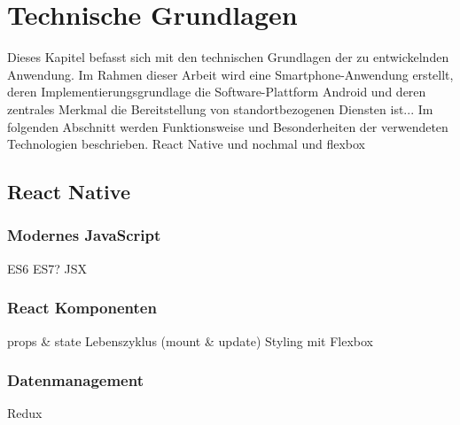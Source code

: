 \chapter{\label{chap:grundlagen}Technische Grundlagen}
Dieses Kapitel befasst sich mit den technischen Grundlagen der zu entwickelnden Anwendung. Im Rahmen dieser Arbeit wird eine \gls{Smartphone}-Anwendung erstellt, deren Implementierungsgrundlage die Software-Plattform Android und deren zentrales Merkmal die Bereitstellung von standortbezogenen Diensten ist... 
Im folgenden Abschnitt werden Funktionsweise und Besonderheiten der verwendeten Technologien beschrieben.
React Native \cite{learningRN} und nochmal \cite{gettingStartedRN} und flexbox \cite{understandingFlexbox}


\section{React Native}
\subsection{Modernes JavaScript}
ES6
ES7?
JSX
\subsection{React Komponenten}
props \& state \newline
Lebenszyklus (mount \& update) \newline
Styling mit Flexbox

\subsection{Datenmanagement}
Redux
